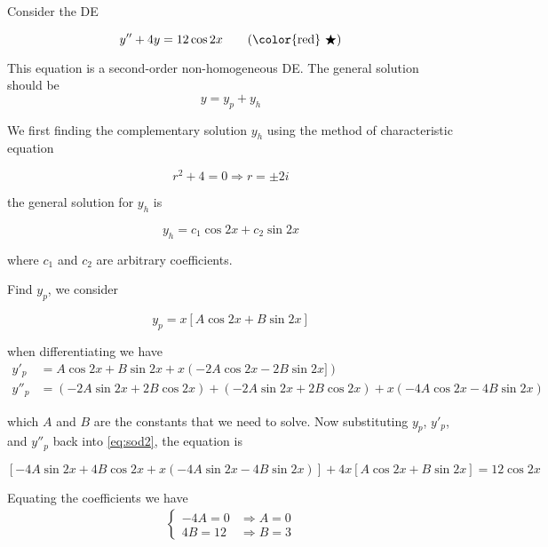 \begin{solution}
    Consider the DE 

    \begin{equation*}
        y'' + 4y = 12 \cos 2x   \label{eq:sod2} \tag{{\color{red} $\bigstar$}}
    \end{equation*}

    This equation is a second-order non-homogeneous DE. The general solution should be 
    \[
        y = y_p + y_h
    \]

    We first finding the complementary solution $y_h$ using the method of 
    characteristic equation

    \begin{equation*}
        r^2 + 4 = 0 \Rightarrow r = \pm 2i
    \end{equation*}

    the general solution for $y_h$ is 

    \begin{equation*}
        y_h = c_1 \cos 2x + c_2 \sin 2x
    \end{equation*}

    where $c_1$ and $c_2$ are arbitrary coefficients.

    Find $y_p$, we consider 

    \[
        y_p = x[A \cos 2x + B \sin 2x]
    \]

    when differentiating we have 
    \begin{align*}
        y'_p &= A \cos 2x + B \sin 2x + x(-2A \cos 2x -2B \sin 2x]) \\[0.5em]
        y''_p &= (-2A \sin 2x + 2B \cos 2x) + (-2A \sin 2x + 2B \cos 2x)
        + x(-4A \cos 2x - 4B \sin 2x)
    \end{align*}

    which $A$ and $B$ are the constants that we need to solve.
    Now substituting $y_p$, $y'_p$, and $y''_p$ back into \eqref{eq:sod2}, the equation is 

    \[
        [-4A \sin 2x + 4B \cos 2x + x(-4A \sin 2x - 4B \sin 2x)] + 4x[A \cos 2x + B\sin 2x] 
        = 12 \cos 2x
    \]

    Equating the coefficients we have 
    \begin{align*}
        \begin{cases}
            -4A = 0 &\Rightarrow A = 0\\
        4B = 12 &\Rightarrow B = 3
        \end{cases}
    \end{align*}


\end{solution}
